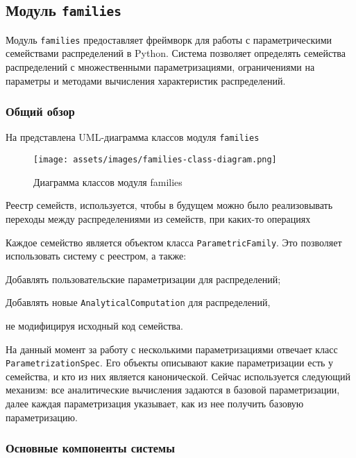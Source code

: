 \subsection{Модуль \texttt{families}}
Модуль \texttt{families} предоставляет фреймворк для работы с параметрическими семействами распределений в Python. Система позволяет определять семейства распределений с множественными параметризациями, ограничениями на параметры и методами вычисления характеристик распределений.

\subsubsection{Общий обзор}

На  представлена UML-диаграмма классов модуля \texttt{families}

\begin{figure}[h]
    \centering
    \texttt{[image: assets/images/families-class-diagram.png]}
    \caption{Диаграмма классов модуля families}
    \label{fig:class-diagram-families}
\end{figure}

Реестр семейств, используется, чтобы в будущем можно было реализовывать переходы между распределениями из семейств, при каких-то операциях

Каждое семейство является объектом класса \texttt{ParametricFamily}. Это позволяет использовать систему с реестром, а также:
\begin{itemizecmp}
    \item Добавлять пользовательские параметризации для распределений;
    \item Добавлять новые \texttt{AnalyticalComputation} для распределений,
\end{itemizecmp}
не модифицируя исходный код семейства. 

На данный момент за работу с несколькими параметризациями отвечает класс \texttt{ParametrizationSpec}. Его объекты описывают какие параметризации есть у семейства, и кто из них является канонической. Сейчас используется следующий механизм: все аналитические вычисления задаются в базовой параметризации, далее каждая параметризация указывает, как из нее получить базовую параметризацию. 

\subsubsection{Основные компоненты системы}

